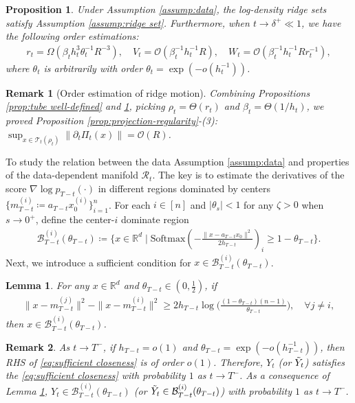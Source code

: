 \documentclass[11pt]{article}
\newcommand{\mb}{\mathbb}
\newcommand{\mc}{\mathcal}
\newcommand{\Softmax}{\mathrm{Softmax}}
\newtheorem{proposition}{Proposition}[section]
\newtheorem{lemma}{Lemma}[section]
\newtheorem{remark}{Remark}[section]
\begin{document}
\begin{proposition}\label{prop:constant estimation} Under Assumption \ref{assump:data}, the log-density ridge sets satisfy Assumption \ref{assump:ridge set}. Furthermore, when $t\to \delta^+\ll 1$, we have the following order estimations:
\begin{align*}
    r_t = \Omega(\beta_t h_t^{3} \theta_t^{-1} R^{-3}),\quad V_t = \mc{O}( {\beta_t^{-1} h_t^{-1}} R  ),\quad W_t =\mc{O} ( \beta_t^{-1}h_t^{-1} R r_t^{-1} ),
\end{align*}
where $\theta_t$ is arbitrarily with order $\theta_t=\exp(- o(h_{t}^{-1}) )$.
\end{proposition}
\begin{remark}[Order estimation of ridge motion]\label{rem:ridge motion bound} Combining Propositions \ref{prop:tube well-defined} and \ref{prop:constant estimation}, picking $\rho_t=\Theta(r_t)$ and $\beta_t=\Theta({1}/{h_t})$, we proved Proposition \ref{prop:projection-regularity}-(3): $\sup_{x\in \mc{T}_t(\rho_t)}\| \partial_t\Pi_t(x)\| = \mc{O}\left( R\right)$. 
\end{remark}
To study the relation between the data Assumption \ref{assump:data} and properties of the data-dependent manifold $\mc{R}_t$. The key is to estimate the derivatives of the score $\nabla\log p_{T-t}(\cdot)$ in different regions dominated by centers $\{m_{T-t}^{(i)}\coloneqq a_{T-t}x_0^{(i)}\}_{i=1}^n$. For each $i\in [n]$ and $|\theta_s|<1$ for any $\zeta>0$ when $s\to 0^+$, define the center-$i$ dominate region
\begin{align}\label{eq:data dominate region}
    \mc{B}_{T-t}^{(i)}(\theta_{T-t}) \coloneqq \{ x\in \mb{R}^d \mid \Softmax(-\frac{\| x-a_{T-t}x_0 \|^2}{2h_{T-t}})_i \ge 1-\theta_{T-t} \}.
\end{align}
Next, we introduce a sufficient condition for $x\in \mc{B}_{T-t}^{(i)}(\theta_{T-t})$.
\begin{lemma}\label{lem:sufficient closeness} For any $x\in \mb{R}^d$ and $\theta_{T-t}\in (0,\tfrac{1}{2})$, if  
\begin{align}\label{eq:sufficient closeness}
    \| x- m_{T-t}^{(j)} \|^2 - \| x- m_{T-t}^{(i)} \|^2 \ge 2h_{T-t}\log\big( \frac{(1-\theta_{T-t})(n-1)}{\theta_{T-t}} \big),\quad \forall j\neq i,
\end{align}
then $x\in \mc{B}_{T-t}^{(i)}(\theta_{T-t})$.
\end{lemma}
\begin{remark}\label{rem:sufficient closeness} As $t\to T^-$, if $h_{T-t}=o(1)$ and $\theta_{T-t}=\exp(- o(h_{T-t}^{-1}) )$, then RHS of \eqref{eq:sufficient closeness} is of order $o(1)$. Therefore, $Y_t$ (or $\Tilde{Y}_t$) satisfies the \eqref{eq:sufficient closeness} with probability $1$ as $t\to T^-$. As a consequence of Lemma \ref{lem:sufficient closeness}, $Y_t\in \mc{B}_{T-t}^{(i)}(\theta_{T-t})$ (or $\Tilde{Y}_t\in \mc{B}_{T-t}^{(i)}(\theta_{T-t})$) with probability $1$ as $t\to T^-$.
\end{remark}
\end{document}
